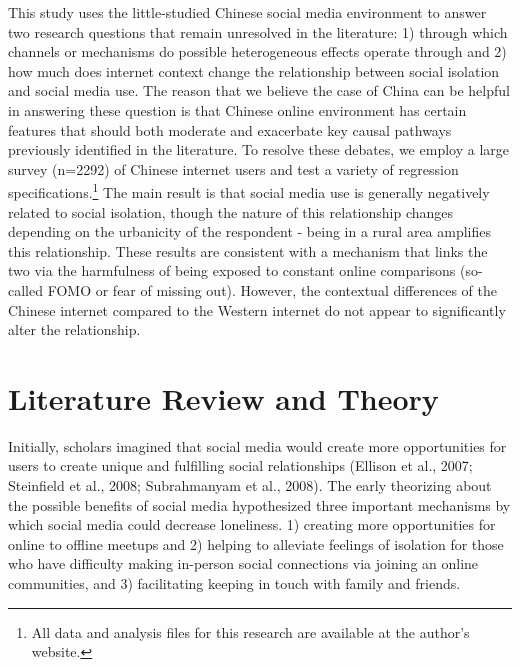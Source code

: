 \documentclass[
  letterpaper,
  DIV=11,
  numbers=noendperiod]{scrartcl}
\begin{document}
This study uses the little-studied Chinese social media environment to
answer two research questions that remain unresolved in the literature:
1) through which channels or mechanisms do possible heterogeneous
effects operate through and 2) how much does internet context change the
relationship between social isolation and social media use. The reason
that we believe the case of China can be helpful in answering these
question is that Chinese online environment has certain features that
should both moderate and exacerbate key causal pathways previously
identified in the literature. To resolve these debates, we employ a
large survey (n=2292) of Chinese internet users and test a variety of
regression specifications.\footnote{All data and analysis files for this
  research are available at the author's website.} The main result is
that social media use is generally negatively related to social
isolation, though the nature of this relationship changes depending on
the urbanicity of the respondent - being in a rural area amplifies this
relationship. These results are consistent with a mechanism that links
the two via the harmfulness of being exposed to constant online
comparisons (so-called FOMO or fear of missing out). However, the
contextual differences of the Chinese internet compared to the Western
internet do not appear to significantly alter the relationship.

\section{Literature Review and
Theory}\label{literature-review-and-theory}

Initially, scholars imagined that social media would create more
opportunities for users to create unique and fulfilling social
relationships (Ellison et al., 2007; Steinfield et al., 2008;
Subrahmanyam et al., 2008). The early theorizing about the possible
benefits of social media hypothesized three important mechanisms by
which social media could decrease loneliness. 1) creating more
opportunities for online to offline meetups and 2) helping to alleviate
feelings of isolation for those who have difficulty making in-person
social connections via joining an online communities, and 3)
facilitating keeping in touch with family and friends.
\end{document}
